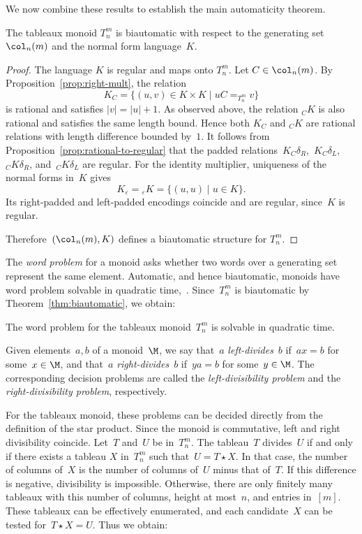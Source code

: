 \documentclass[a4paper, twoside, 11pt, english]{article}
\begin{document}
We now combine these results to establish the main automaticity theorem.

\begin{theorem}
\label{thm:biautomatic}
The tableaux monoid $T_n^m$ is biautomatic with respect to the
generating set $\col_n(m)$ and the normal form language~$K$.
\end{theorem}

\begin{proof}
The language $K$ is regular and maps onto $T_n^m$.
Let $C\in\col_n(m)$.
By Proposition~\ref{prop:right-mult}, the relation
\[
K_C=\{(u,v)\in K\times K\mid uC =_{T_n^m} v\}
\]
is rational and satisfies $|v|=|u|+1$.
As observed above, the relation ${}_C K$ is also rational and satisfies
the same length bound.
Hence both $K_C$ and ${}_C K$ are rational relations with length
difference bounded by~$1$.
It follows from Proposition~\ref{prop:rational-to-regular} that the
padded relations~$K_C\delta_R$,~$K_C\delta_L$,~${}_C K\delta_R$, and~${}_C K\delta_L$
are regular.
For the identity multiplier, uniqueness of the normal forms in~$K$
gives
\[
K_\varepsilon={}_\varepsilon K
=\{(u,u)\mid u\in K\}.
\]
Its right-padded and left-padded encodings coincide and are regular,
since~$K$ is regular.

Therefore~$(\col_n(m),K)$ defines a biautomatic structure for $T_n^m$.
\end{proof}


The \emph{word problem} for a monoid asks whether two words over
a generating set represent the same element.
Automatic, and hence biautomatic, monoids have word problem
solvable in quadratic time,~\cite[Corollary~3.7]{CRRT01}.
Since~$T_n^m$ is biautomatic by
Theorem~\ref{thm:biautomatic}, we obtain:

\begin{corollary}
\label{cor:word-problem}
The word problem for the tableaux monoid~$T_n^m$ is solvable
in quadratic time.
\end{corollary}

Given elements~$a,b$ of a monoid~$\M$, we say that~$a$
\emph{left-divides}~$b$ if~$ax=b$ for some~$x\in\M$, and
that~$a$ \emph{right-divides}~$b$ if~$ya=b$ for some~$y\in\M$.
The corresponding decision problems are called the \emph{left-divisibility problem} and the \emph{right-divisibility problem}, respectively.

For the tableaux monoid, these problems can be decided directly
from the definition of the star product.
Since the monoid is commutative, left and right divisibility
coincide.
Let~$T$ and~$U$ be in~$T_n^m$.
The tableau~$T$ divides~$U$ if and only if there exists a tableau
$X$ in~$T_n^m$ such that~$U=T\star X$.
In that case, the number of columns of~$X$ is the number of
columns of~$U$ minus that of~$T$.
If this difference is negative, divisibility is impossible.
Otherwise, there are only finitely many tableaux with this
number of columns, height at most~$n$, and entries in~$[m]$.
These tableaux can be effectively enumerated, and each
candidate~$X$ can be tested for~$T\star X=U$.
Thus we obtain:
\end{document}
